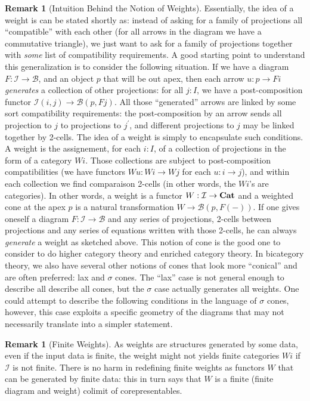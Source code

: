 \documentclass{article}
\numberwithin{equation}{section}
\theoremstyle{definition}
\newtheorem{remark}[equation]{Remark}
\theoremstyle{plain}
\newcommand{\Cat}{\textnormal{\textbf{Cat}}}
\begin{document}
\begin{remark}[Intuition Behind the Notion of Weights]
	Essentially, the idea of a weight is can be stated shortly as: instead of asking for a family of projections all ``compatible'' with each other (for all arrows in the diagram we have a commutative triangle), we just want to ask for a family of projections together with \textit{some} list of compatibility requirements. A good starting point to understand this generalization is to consider the following situation. If we have a diagram $F:\mathcal{I} \to \mathcal{B}$, and an object $p$ that will be out apex, then each arrow $u: p \to Fi$ \textit{generates} a collection of other projections: for all $j: I$, we have a post-composition functor $\mathcal{I}(i,j) \to \mathcal{B}(p,Fj)$. All those ``generated'' arrows are linked by some sort compatibility requirements: the post-composition by an arrow sends all projection to $j$ to projections to $j^{\prime}$, and different projections to $j$ may be linked together by 2-cells. The idea of a weight is simply to encapsulate such conditions. A weight is the assignement, for each $i:I$, of a collection of projections in the form of a category $Wi$. Those collections are subject to post-composition compatibilities (we have functors $Wu:Wi \to Wj$ for each $u:i \to j$), and within each collection we find comparaison 2-cells (in other words, the $Wi$'s are categories). In other words, a weight is a functor $W: \mathcal{I} \to \Cat$ and a weighted cone at the apex $p$ is a natural transformation $W \to \mathcal{B}(p,F(-))$. If one gives oneself a diagram $F:\mathcal{I} \to \mathcal{B}$ and any series of projections, 2-cells between projections and any series of equations written with those 2-cells, he can always \textit{generate} a weight as sketched above. This notion of cone is the good one to consider to do higher category theory and enriched category theory. In bicategory theory, we also have several other notions of cones that look more ``conical'' and are often preferred: lax and $\sigma$ cones. The ``lax'' case is not general enough to describe all describe all cones, but the $\sigma$ case actually generates all weights. One could attempt to describe the following conditions in the language of $\sigma$ cones, however, this case exploits a specific geometry of the diagrams that may not necessarily translate into a simpler statement.
\end{remark}

\begin{remark}[Finite Weights]
	As weights are structures generated by some data, even if the input data is finite, the weight might not yields finite categories $Wi$ if $\mathcal{I}$ is not finite. There is no harm in redefining finite weights as functors $W$ that can be generated by finite data: this in turn says that $W$ is a finite (finite diagram and weight) colimit of corepresentables.
\end{remark}
\end{document}

